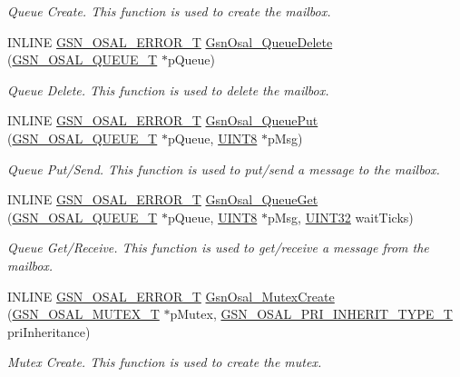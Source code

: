 \begin{DoxyCompactItemize}
\begin{DoxyCompactList}\small\item\em Queue Create. This function is used to create the mailbox. \end{DoxyCompactList}\item 
INLINE \hyperlink{a00659_ga36216a7aacd1d5024bc7b8bf39c3f46b}{GSN\_\-OSAL\_\-ERROR\_\-T} \hyperlink{a00628_ga52ee4c5716ea5f675b1b11b79dd2c130}{GsnOsal\_\-QueueDelete} (\hyperlink{a00628_gaebe1c924d01bf6607bd65961bf134095}{GSN\_\-OSAL\_\-QUEUE\_\-T} $\ast$pQueue)
\begin{DoxyCompactList}\small\item\em Queue Delete. This function is used to delete the mailbox. \end{DoxyCompactList}\item 
INLINE \hyperlink{a00659_ga36216a7aacd1d5024bc7b8bf39c3f46b}{GSN\_\-OSAL\_\-ERROR\_\-T} \hyperlink{a00628_ga67adc0a9e709aabc4e9e4c8ff0241e81}{GsnOsal\_\-QueuePut} (\hyperlink{a00628_gaebe1c924d01bf6607bd65961bf134095}{GSN\_\-OSAL\_\-QUEUE\_\-T} $\ast$pQueue, \hyperlink{a00660_gab27e9918b538ce9d8ca692479b375b6a}{UINT8} $\ast$pMsg)
\begin{DoxyCompactList}\small\item\em Queue Put/Send. This function is used to put/send a message to the mailbox. \end{DoxyCompactList}\item 
INLINE \hyperlink{a00659_ga36216a7aacd1d5024bc7b8bf39c3f46b}{GSN\_\-OSAL\_\-ERROR\_\-T} \hyperlink{a00628_ga4db12c3f53ae65618056f1ebab33f1b5}{GsnOsal\_\-QueueGet} (\hyperlink{a00628_gaebe1c924d01bf6607bd65961bf134095}{GSN\_\-OSAL\_\-QUEUE\_\-T} $\ast$pQueue, \hyperlink{a00660_gab27e9918b538ce9d8ca692479b375b6a}{UINT8} $\ast$pMsg, \hyperlink{a00660_gae1e6edbbc26d6fbc71a90190d0266018}{UINT32} waitTicks)
\begin{DoxyCompactList}\small\item\em Queue Get/Receive. This function is used to get/receive a message from the mailbox. \end{DoxyCompactList}\item 
INLINE \hyperlink{a00659_ga36216a7aacd1d5024bc7b8bf39c3f46b}{GSN\_\-OSAL\_\-ERROR\_\-T} \hyperlink{a00628_gabef97b0a9c9c1d341e950d3b415a347d}{GsnOsal\_\-MutexCreate} (\hyperlink{a00628_gae997291afc7166c897f459023e0154ad}{GSN\_\-OSAL\_\-MUTEX\_\-T} $\ast$pMutex, \hyperlink{a00628_gafc2ee1bc516d2ae2d9a29757cbe45469}{GSN\_\-OSAL\_\-PRI\_\-INHERIT\_\-TYPE\_\-T} priInheritance)
\begin{DoxyCompactList}\small\item\em Mutex Create. This function is used to create the mutex. \end{DoxyCompactList}\item 

\end{DoxyCompactItemize}
